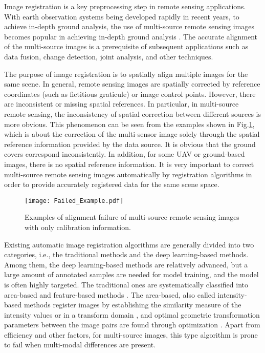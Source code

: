 Image registration is a key preprocessing step in remote sensing applications. With earth observation systems being developed rapidly in
recent years, to achieve in-depth ground analysis, the use of multi-source remote sensing images becomes popular in achieving in-depth ground analysis \cite{zhang2018feature,zhao2020joint,liu2020joint,zhang2020transfer,gao2021hyperspectral}. The accurate alignment of the multi-source images is a prerequisite of subsequent applications such as data fusion, change detection, joint analysis, and other techniques.

The purpose of image registration is to spatially align multiple images for the same scene. In general, remote sensing images are spatially corrected by reference coordinates (such as fictitious graticule) or image control points. However, there are inconsistent or missing spatial references. In particular, in multi-source remote sensing, the inconsistency of spatial correction between different sources is more obvious. This phenomenon can be seen from the examples shown in Fig.\ref{fig:fail}, which is about the correction of the multi-sensor image solely through the spatial reference information provided by the data source. It is obvious that the ground covers correspond inconsistently. In addition, for some UAV or ground-based images, there is no spatial reference information. It is very important to correct multi-source remote sensing images automatically by registration algorithms in order to provide accurately registered data for the same scene space.

\begin{figure}[h!]
 \begin{center}
  \texttt{[image: Failed\_Example.pdf]}
  \caption{Examples of alignment failure of multi-source remote sensing images with only calibration information.}
  \label{fig:fail}
 \end{center}
\end{figure}

Existing automatic image registration algorithms are generally divided into two categories, i.e., the traditional methods and the deep learning-based methods. Among them, the deep learning-based methods \cite{litjens2017survey} are relatively advanced, but a large amount of annotated samples are needed for model training, and the model is often highly targeted. The traditional ones are systematically classified into area-based and feature-based methods \cite{zitova2003image}. The area-based, also called intensity-based methods
register images by establishing the similarity measure of the intensity values or in a transform domain \cite{pratt1974correlation,de1987registration,viola1997alignment,le2002automated,pluim2003mutual,mahmood2011correlation,oliveira2014medical,tong2015novel}, and optimal geometric transformation parameters between the image pairs are found through optimization \cite{zhang2021multimodal}. Apart from efficiency and other factors, for multi-source images, this type algorithm is prone to fail when multi-modal differences are present.

